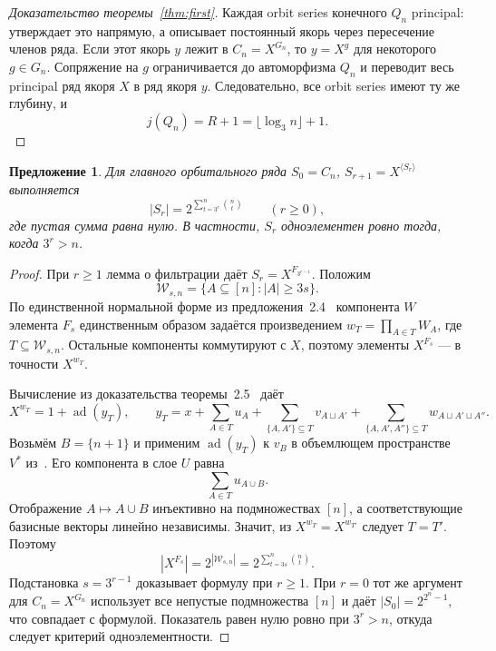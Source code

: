 \documentclass[11pt,a4paper]{article}
\newtheorem{proposition}[theorem]{Предложение}
\theoremstyle{definition}
\theoremstyle{remark}
\newcommand{\ad}{\operatorname{ad}}
\begin{document}
\begin{proof}[Доказательство теоремы~\ref{thm:first}]
Каждая orbit series конечного \(Q_n\) principal:
\cite[следствие~4.8]{BCNW} утверждает это напрямую, а
\cite[предложение~4.6]{BCNW} описывает постоянный якорь через пересечение
членов ряда. Если этот якорь \(y\) лежит в \(C_n=X^{G_n}\), то
\(y=X^g\) для некоторого \(g\in G_n\). Сопряжение на \(g\) ограничивается
до автоморфизма \(Q_n\) и переводит весь principal ряд якоря \(X\)
в ряд якоря \(y\). Следовательно, все orbit series имеют ту же глубину,
и
\[
\boxed{j(Q_n)=R+1=\lfloor\log_3n\rfloor+1.}
\]
\end{proof}

\begin{proposition}\label{prop:orbit-cardinalities}
Для главного орбитального ряда
\(S_0=C_n\), \(S_{r+1}=X^{\langle S_r\rangle}\) выполняется
\[
 |S_r|=2^{\displaystyle\sum_{t=3^r}^{n}\binom nt}
 \qquad(r\ge0),
\]
где пустая сумма равна нулю. В частности, \(S_r\) одноэлементен
ровно тогда, когда \(3^r>n\).
\end{proposition}
\begin{proof}
При \(r\ge1\) лемма о фильтрации даёт
\(S_r=X^{F_{3^{r-1}}}\). Положим
\[
 \mathcal W_{s,n}=\{A\subseteq[n]: |A|\ge3s\}.
\]
По единственной нормальной форме из предложения~2.4~\cite{NTT}
компонента \(W\) элемента \(F_s\) единственным образом задаётся
произведением \(w_T=\prod_{A\in T}W_A\), где
\(T\subseteq\mathcal W_{s,n}\). Остальные компоненты коммутируют
с \(X\), поэтому элементы \(X^{F_s}\) — в точности \(X^{w_T}\).

Вычисление из доказательства теоремы~2.5~\cite{NTT} даёт
\[
 X^{w_T}=1+\ad(y_T),\qquad
 y_T=x+\sum_{A\in T}u_A
 +\sum_{\{A,A'\}\subseteq T}v_{A\sqcup A'}
 +\sum_{\{A,A',A''\}\subseteq T}w_{A\sqcup A'\sqcup A''}.
\]
Возьмём \(B=\{n+1\}\) и применим \(\ad(y_T)\) к \(v_B\)
в объемлющем пространстве \(V^*\) из~\cite{NTT}. Его компонента
в слое \(U\) равна
\[
 \sum_{A\in T}u_{A\cup B}.
\]
Отображение \(A\mapsto A\cup B\) инъективно на подмножествах
\([n]\), а соответствующие базисные векторы линейно независимы.
Значит, из \(X^{w_T}=X^{w_{T'}}\) следует \(T=T'\). Поэтому
\[
 |X^{F_s}|=2^{|\mathcal W_{s,n}|}
 =2^{\sum_{t=3s}^{n}\binom nt}.
\]
Подстановка \(s=3^{r-1}\) доказывает формулу при \(r\ge1\).
При \(r=0\) тот же аргумент для \(C_n=X^{G_n}\) использует все
непустые подмножества \([n]\) и даёт \(|S_0|=2^{2^n-1}\), что
совпадает с формулой. Показатель равен нулю ровно при \(3^r>n\),
откуда следует критерий одноэлементности.
\end{proof}
\end{document}
